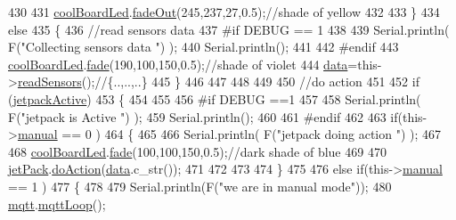 \begin{DoxyCode}
430         
431         \hyperlink{class_cool_board_a1b1d3c684a5baa56b08486e192fd8e97}{coolBoardLed}.\hyperlink{class_cool_board_led_a93d545679237e8cc858324367149775c}{fadeOut}(245,237,27,0.5);\textcolor{comment}{//shade of yellow}
432                 
433     \}   
434     \textcolor{keywordflow}{else}
435     \{
436         \textcolor{comment}{//read sensors data}
437 \textcolor{preprocessor}{    #if DEBUG == 1}
438 
439         Serial.println( F(\textcolor{stringliteral}{"Collecting sensors data "}) );
440         Serial.println();
441     
442 \textcolor{preprocessor}{    #endif}
443         \hyperlink{class_cool_board_a1b1d3c684a5baa56b08486e192fd8e97}{coolBoardLed}.\hyperlink{class_cool_board_led_af1cacbaa88db8bcf6042c1083ba41155}{fade}(190,100,150,0.5);\textcolor{comment}{//shade of violet        }
444         \hyperlink{class_cool_board_a427fb753dd8575bdf821c70a5c63d695}{data}=this->\hyperlink{class_cool_board_ad03abdce2e65f520bbf2cff0f2d083cf}{readSensors}();\textcolor{comment}{//\{..,..,..\}}
445     \}
446     
447 
448 
449 
450     \textcolor{comment}{//do action}
451 
452     \textcolor{keywordflow}{if} (\hyperlink{class_cool_board_a9be03a913d26e558328935ca3b59a75e}{jetpackActive})
453     \{
454 
455 
456 \textcolor{preprocessor}{    #if DEBUG ==1}
457 
458         Serial.println( F(\textcolor{stringliteral}{"jetpack is Active "}) );
459         Serial.println();
460 
461 \textcolor{preprocessor}{    #endif}
462     
463         \textcolor{keywordflow}{if}(this->\hyperlink{class_cool_board_a7c8e505a5804b109e112d5a03df6ea2b}{manual} == 0 )
464         \{
465 
466             Serial.println( F(\textcolor{stringliteral}{"jetpack doing action "}) );
467 
468             \hyperlink{class_cool_board_a1b1d3c684a5baa56b08486e192fd8e97}{coolBoardLed}.\hyperlink{class_cool_board_led_af1cacbaa88db8bcf6042c1083ba41155}{fade}(100,100,150,0.5);\textcolor{comment}{//dark shade of blue     }
469 
470             \hyperlink{class_cool_board_a30b1357881b01ccbec676856a91e48e9}{jetPack}.\hyperlink{class_jetpack_a9e703197093094b963f9ad57817495b8}{doAction}(\hyperlink{class_cool_board_a427fb753dd8575bdf821c70a5c63d695}{data}.c\_str());
471             
472 
473         
474         \}
475         
476         \textcolor{keywordflow}{else} \textcolor{keywordflow}{if}(this->\hyperlink{class_cool_board_a7c8e505a5804b109e112d5a03df6ea2b}{manual} == 1 )
477         \{
478         
479             Serial.println(F(\textcolor{stringliteral}{"we are in manual mode"}));
480             \hyperlink{class_cool_board_a2399f44d7c23c1149a335cb3b46d90f1}{mqtt}.\hyperlink{class_cool_m_q_t_t_aa5eaae967b562b62cbcf2b8d81f6e5d5}{mqttLoop}();

\end{DoxyCode}
